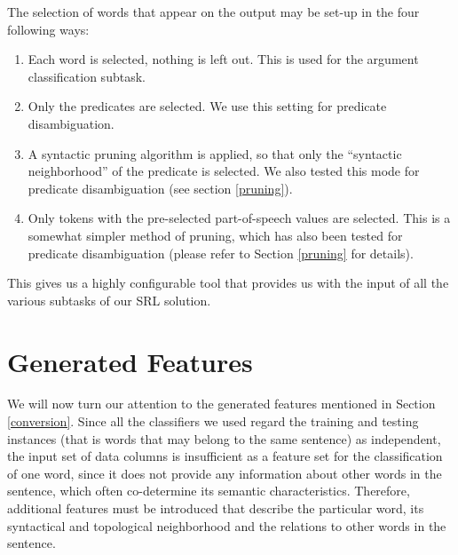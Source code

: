 \documentclass[12pt,notitlepage]{report}
\begin{document}
The selection of words that appear on the output may be set-up in the four following ways:
\begin{enumerate}
    \item Each word is selected, nothing is left out. This is used for the argument classification subtask.
    \item Only the predicates are selected. We use this setting for predicate disambiguation.
    \item A syntactic pruning algorithm \citep{asahara09,zhao09} is applied, so that only the ``syntactic neighborhood'' of the predicate is selected. We also tested this mode for predicate disambiguation (see section \ref{pruning}).
    \item Only tokens with the pre-selected part-of-speech values are selected. This is a somewhat simpler method of pruning, which has also been tested for predicate disambiguation (please refer to Section \ref{pruning} for details).
\end{enumerate}

This gives us a highly configurable tool that provides us with the input of all the various subtasks of our SRL solution.

\section{Generated Features}\label{features}

We will now turn our attention to the generated features mentioned in Section \ref{conversion}. Since all the classifiers we used regard the training and testing instances (that is words that may belong to the same sentence) as independent, the input set of data columns is insufficient as a feature set for the classification of one word, since it does not provide any information about other words in the sentence, which often co-determine its semantic characteristics. Therefore, additional features must be introduced that describe the particular word, its syntactical and topological neighborhood and the relations to other words in the sentence.
\end{document}
